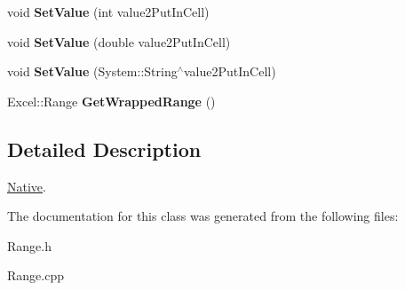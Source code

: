 \begin{DoxyCompactItemize}
\item 
\hypertarget{class_excel_application_wrapper_1_1_range_a68a474101e1c1853344e0f0e1866d6ef}{}void {\bfseries Set\+Value} (int value2\+Put\+In\+Cell)\label{class_excel_application_wrapper_1_1_range_a68a474101e1c1853344e0f0e1866d6ef}

\item 
\hypertarget{class_excel_application_wrapper_1_1_range_a7219eb0b4fec892adadd9100e66d009f}{}void {\bfseries Set\+Value} (double value2\+Put\+In\+Cell)\label{class_excel_application_wrapper_1_1_range_a7219eb0b4fec892adadd9100e66d009f}

\item 
\hypertarget{class_excel_application_wrapper_1_1_range_a3e0cb25878ed9462aaf8c99c512c71ee}{}void {\bfseries Set\+Value} (System\+::\+String$^\wedge$value2\+Put\+In\+Cell)\label{class_excel_application_wrapper_1_1_range_a3e0cb25878ed9462aaf8c99c512c71ee}

\item 
\hypertarget{class_excel_application_wrapper_1_1_range_a67e641546d825a830922ee4cf9a87bff}{}Excel\+::\+Range {\bfseries Get\+Wrapped\+Range} ()\label{class_excel_application_wrapper_1_1_range_a67e641546d825a830922ee4cf9a87bff}

\end{DoxyCompactItemize}


\subsection{Detailed Description}
\hyperlink{class_native}{Native}. 

The documentation for this class was generated from the following files\+:\begin{DoxyCompactItemize}
\item 
Range.\+h\item 
Range.\+cpp\end{DoxyCompactItemize}
